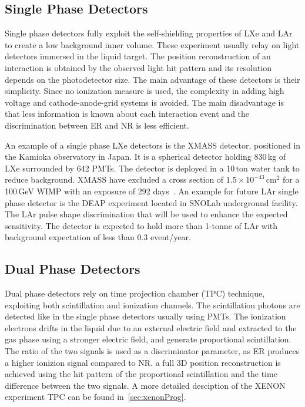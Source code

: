 \subsection{Single Phase Detectors}
\label{sec:singlePhase}
 
Single phase detectors fully exploit the self-shielding properties of LXe and LAr to create a low background inner volume. These experiment usually relay on light detectors immersed in the liquid target. The position reconstruction of an interaction is obtained by the observed light hit pattern and its resolution depends on the photodetector size. The main advantage of these detectors is their simplicity. Since no ionization measure is used, the complexity in adding high voltage and cathode-anode-grid systems is avoided. The main disadvantage is that less information is known about each interaction event and the discrimination between ER and NR is less efficient. 

An example of a single phase LXe detectors is the XMASS detector, positioned in the Kamioka observatory in Japan. It is a spherical detector holding 830\,kg of LXe  surrounded by 642 PMTs. The detector is deployed in a 10\,ton water tank to reduce background. XMASS have excluded a cross section of $1.5\times 10^{-43}$\,cm$^2$ for a 100\,GeV WIMP with an exposure of 292 days~\cite{Hiraide:2016ryf}. An example for future LAr single phase detector is the DEAP experiment located in SNOLab underground facility. The LAr pulse shape discrimination that will be used to enhance the expected sensitivity. The detector is expected to hold more than 1-tonne of LAr with background expectation of less than $0.3$ event/year. 
 
\subsection{Dual Phase Detectors}
\label{sec:dualPhase}

Dual phase detectors rely on time projection chamber (TPC) technique, exploiting both scintillation and ionization channels. The scintillation photons are detected like in the single phase detectors usually using PMTs. The ionization electrons drifts in the liquid due to an external electric field and extracted to the gas phase using a stronger electric field, and generate proportional scintillation. The ratio of the two signals is used as a discriminator parameter, as ER produces a higher ionizion signal compared to NR. a full 3D position reconstruction is achieved using the hit pattern of the proportional scintillation and the time difference between the two signals. A more detailed desciption of the XENON experiment TPC can be found in~\ref{sec:xenonProg}.

